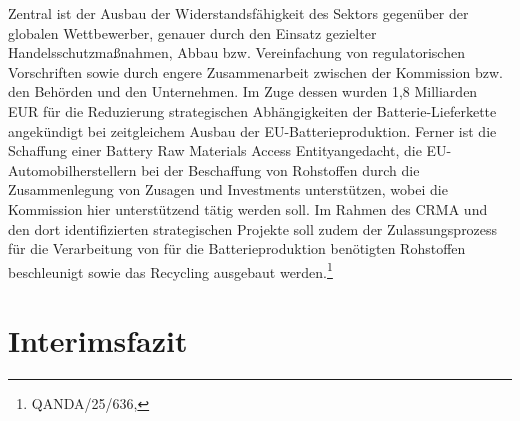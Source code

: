 \documentclass[12pt,a4paper,oneside]{book} %
\begin{document}
	
	Zentral ist der Ausbau der Widerstandsfähigkeit des Sektors gegenüber der globalen Wettbewerber, genauer durch den Einsatz gezielter Handelsschutzmaßnahmen, Abbau bzw. Vereinfachung von regulatorischen Vorschriften sowie durch engere Zusammenarbeit zwischen der Kommission bzw. den Behörden und den Unternehmen. Im Zuge dessen wurden 1,8 Milliarden EUR für die Reduzierung strategischen Abhängigkeiten der Batterie-Lieferkette angekündigt bei zeitgleichem Ausbau der EU-Batterieproduktion. Ferner ist die Schaffung einer \glqq Battery Raw Materials Access Entity\grqq angedacht, die EU-Automobilherstellern bei der Beschaffung von Rohstoffen durch die Zusammenlegung von Zusagen und Investments unterstützen, wobei die Kommission hier unterstützend tätig werden soll. Im Rahmen des CRMA und den dort identifizierten strategischen Projekte soll zudem der Zulassungsprozess für die Verarbeitung von für die Batterieproduktion benötigten Rohstoffen beschleunigt sowie das Recycling ausgebaut werden.\footnote{QANDA/25/636, }
	
	
	
	\section{Interimsfazit}
\end{document}
